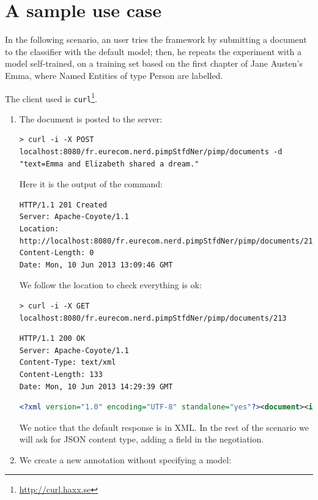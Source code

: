 \documentclass[a4paper,11pt]{report}
\begin{document}

\section{A sample use case}
In the following scenario, an user tries the framework by submitting a document to the classifier with the default model; then, he repeats the experiment with a model self-trained, on a training set based on the first chapter of Jane Austen's Emma, where Named Entities of type Person are labelled.

The client used is \texttt{curl}\footnote{\url{http://curl.haxx.se}}.

\begin{enumerate}
\item The document is posted to the server:

\begin{lstlisting}
> curl -i -X POST localhost:8080/fr.eurecom.nerd.pimpStfdNer/pimp/documents -d "text=Emma and Elizabeth shared a dream."
\end{lstlisting}

Here it is the output of the command:
\begin{lstlisting}
HTTP/1.1 201 Created
Server: Apache-Coyote/1.1
Location: http://localhost:8080/fr.eurecom.nerd.pimpStfdNer/pimp/documents/213
Content-Length: 0
Date: Mon, 10 Jun 2013 13:09:46 GMT
\end{lstlisting}

We follow the location to check everything is ok:

\begin{lstlisting}
> curl -i -X GET localhost:8080/fr.eurecom.nerd.pimpStfdNer/pimp/documents/213
\end{lstlisting}

\begin{lstlisting}
HTTP/1.1 200 OK
Server: Apache-Coyote/1.1
Content-Type: text/xml
Content-Length: 133
Date: Mon, 10 Jun 2013 14:29:39 GMT

\end{lstlisting}

\noindent
\begin{lstlisting}[language=XML]
<?xml version="1.0" encoding="UTF-8" standalone="yes"?><document><id>213</id><text>Emma and Elizabeth shared a dream.</text></document>
\end{lstlisting}

We notice that the default response is in XML. In the rest of the scenario we will ask for JSON content type, adding a field in the negotiation.
\item We create a new annotation without specifying a model:


\end{enumerate}
\end{document}
